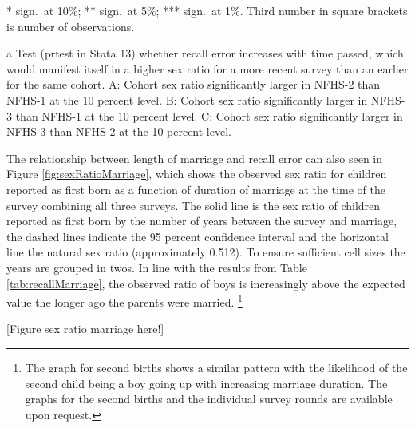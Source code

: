 \documentclass[12pt,letterpaper]{article}
\begin{document}
\begin{table}[htbp]
\begin{center}
\begin{small}
\begin{threeparttable}
\begin{tablenotes}
* sign.\ at 10\%; ** sign.\ at 5\%; *** sign.\ at 1\%.
Third number in square brackets is number of observations.
\item[a] 
Test (prtest in Stata 13) whether recall error increases 
with time passed, which would manifest itself in a higher sex ratio for a more recent
survey than an earlier for the same cohort.
A: Cohort sex ratio significantly larger in NFHS-2 than NFHS-1 at the 10 percent level. 
B: Cohort sex ratio significantly larger in NFHS-3 than NFHS-1 at the 10 percent level. 
C: Cohort sex ratio significantly larger in NFHS-3 than NFHS-2 at the 10 percent level. 
\end{tablenotes}
\end{threeparttable}
\end{small}
\end{center}
\end{table}

The relationship between length of marriage and recall error can also seen in 
Figure \ref{fig:sexRatioMarriage}, which shows the observed sex ratio for children reported
as first born as a function of duration of marriage at the time of the survey combining 
all three surveys.
The solid line is the sex ratio of children reported 
as first born by the number of years between the survey and marriage, 
the dashed lines indicate the 95 percent confidence interval 
and the horizontal line the natural sex ratio (approximately 0.512).
To ensure sufficient cell sizes the years are grouped in twos.
In line with the results from Table \ref{tab:recallMarriage}, the observed ratio of boys 
is increasingly above the expected value the longer ago the parents were married.%
\footnote{
The graph for second births shows a similar pattern with the
likelihood of the second child being a boy going up with increasing marriage duration.
The graphs for the second births and the individual survey rounds are available upon request.
}

[Figure sex ratio marriage here!]

\end{document}
